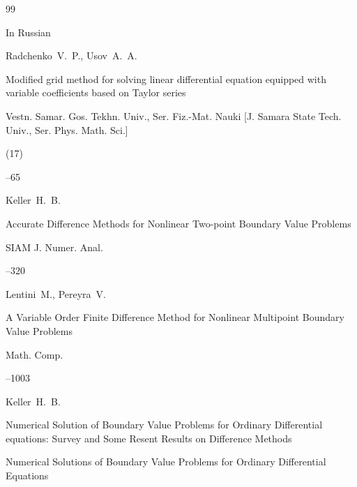 \begin{thebibliography}{99}




\lang In Russian

\by Radchenko~V.~P., Usov~A.~A.

\paper Modified grid method for solving linear differential equation equipped with variable coefficients based on Taylor series

\jour Vestn. Samar. Gos. Tekhn. Univ., Ser. Fiz.-Mat. Nauki \rm [J. Samara State Tech. Univ., Ser. Phys. Math. Sci.]


(17)

--65





\by Keller~H.~B.

\paper Accurate Difference Methods for Nonlinear Two-point Boundary Value Problems

\jour SIAM J. Numer. Anal.





--320




\by Lentini~M., Pereyra~V.

\paper A Variable Order Finite Difference Method for Nonlinear Multipoint Boundary Value Problems

\jour Math. Comp.




--1003







\by Keller~H.~B.

\paper Numerical Solution of Boundary Value Problems for Ordinary Differential equations: Survey and Some Resent Results on Difference Methods

\inbook Numerical Solutions of Boundary Value Problems for Ordinary Differential Equations


\end{thebibliography}
